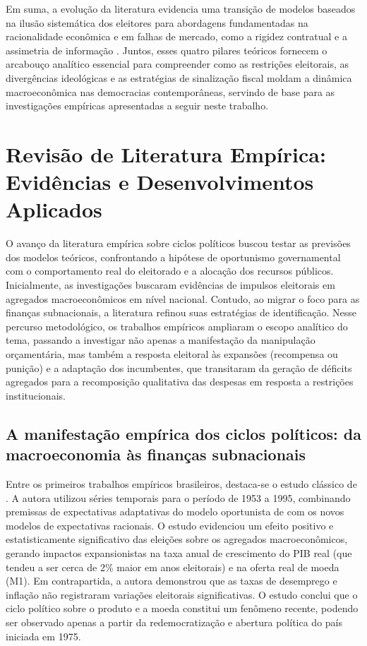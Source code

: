 Em suma, a evolução da literatura evidencia uma transição de modelos baseados na ilusão sistemática dos eleitores \parencite{nordhaus1975, hibbs1977} para abordagens fundamentadas na racionalidade econômica e em falhas de mercado, como a rigidez contratual \parencite{alesina1987} e a assimetria de informação \parencite{rogoff1990}. Juntos, esses quatro pilares teóricos fornecem o arcabouço analítico essencial para compreender como as restrições eleitorais, as divergências ideológicas e as estratégias de sinalização fiscal moldam a dinâmica macroeconômica nas democracias contemporâneas, servindo de base para as investigações empíricas apresentadas a seguir neste trabalho.

\section{Revisão de Literatura Empírica: Evidências e Desenvolvimentos Aplicados}

O avanço da literatura empírica sobre ciclos políticos buscou testar as previsões dos modelos teóricos, confrontando a hipótese de oportunismo governamental com o comportamento real do eleitorado e a alocação dos recursos públicos. Inicialmente, as investigações buscaram evidências de impulsos eleitorais em agregados macroeconômicos em nível nacional. Contudo, ao migrar o foco para as finanças subnacionais, a literatura refinou suas estratégias de identificação. Nesse percurso metodológico, os trabalhos empíricos ampliaram o escopo analítico do tema, passando a investigar não apenas a manifestação da manipulação orçamentária, mas também a resposta eleitoral às expansões (recompensa ou punição) e a adaptação dos incumbentes, que transitaram da geração de déficits agregados para a recomposição qualitativa das despesas em resposta a restrições institucionais.

\subsection{A manifestação empírica dos ciclos políticos: da macroeconomia às finanças subnacionais}

Entre os primeiros trabalhos empíricos brasileiros, destaca-se o estudo clássico de \textcite{fialho1997}. A autora utilizou séries temporais para o período de 1953 a 1995, combinando premissas de expectativas adaptativas do modelo oportunista de \textcite{nordhaus1975} com os novos modelos de expectativas racionais. O estudo evidenciou um efeito positivo e estatisticamente significativo das eleições sobre os agregados macroeconômicos, gerando impactos expansionistas na taxa anual de crescimento do PIB real (que tendeu a ser cerca de 2\% maior em anos eleitorais) e na oferta real de moeda (M1). Em contrapartida, a autora demonstrou que as taxas de desemprego e inflação não registraram variações eleitorais significativas. O estudo conclui que o ciclo político sobre o produto e a moeda constitui um fenômeno recente, podendo ser observado apenas a partir da redemocratização e abertura política do país iniciada em 1975.

